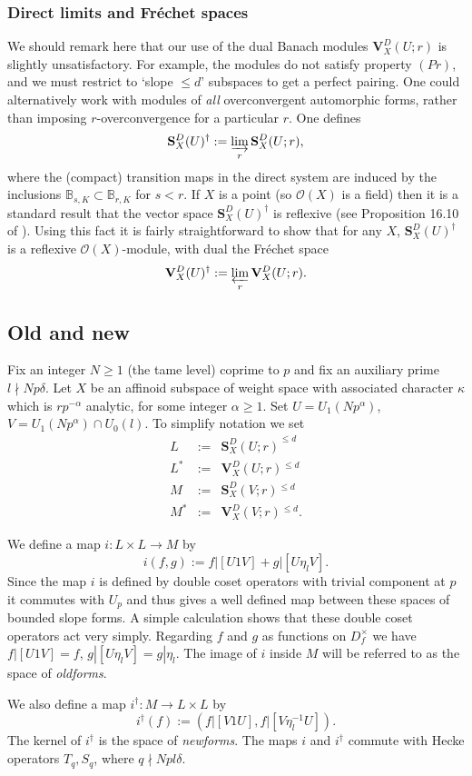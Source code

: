 \documentclass[a4paper, notitlepage]{amsart}
\newcommand{\M}{\ensuremath{\mathfrak{M}}\xspace}
\newcommand{\OO}{\ensuremath{\mathscr{O}}\xspace}
\newcommand{\OC}{\ensuremath{\mathbf{S}^D_{X}(U;r)}\xspace}
\newcommand{\OCdag}{\ensuremath{\mathbf{S}^D_{X}(U)^\dagger}\xspace}
\newcommand{\OCddag}{\ensuremath{\mathbf{V}^D_{X}(U)^\dagger}\xspace}
\newcommand{\OCV}{\ensuremath{\mathbf{S}^D_{X}(V;r)}\xspace}
\newcommand{\OCd}{\ensuremath{\mathbf{V}^D_{X}(U;r)}\xspace}
\newcommand{\OCdV}{\ensuremath{\mathbf{V}^D_{X}(V;r)}\xspace}
\newcommand{\s}{\ensuremath{^{\leq d}}\xspace}
\newcommand{\UU}{\ensuremath{U_1(Np^\alpha)}\xspace}
\newcommand{\VV}{\ensuremath{U_1(Np^\alpha)\cap U_0(l)}\xspace}
\begin{document}
\subsubsection{Direct limits and Fr\'echet spaces}
We should remark here that our use of the dual Banach modules $\OCd$ is slightly unsatisfactory. For example, the modules do not satisfy property $(Pr)$, and we must restrict to `slope $\leq d$' subspaces to get a perfect pairing. One could alternatively work with modules of \emph{all} overconvergent automorphic forms, rather than imposing $r$-overconvergence for a particular $r$. One defines
$$\OCdag :=  \varinjlim_r \OC,$$
where the (compact) transition maps in the direct system are induced by the inclusions $\mathbb{B}_{s,K} \subset \mathbb{B}_{r,K}$ for $s < r$. 
If $X$ is a point (so $\OO(X)$ is a field) then it is a standard result that the vector space $\OCdag$ is reflexive (see Proposition 16.10 of \cite{NFA}). Using this fact it is fairly straightforward to show that for any $X$, $\OCdag$ is a reflexive $\OO(X)$-module, with dual the Fr\'echet space
$$\OCddag := \varprojlim_r \OCd.$$
\subsection{Old and new}\label{oldnew}
Fix an integer $N\ge 1$ (the tame level) coprime to $p$ and fix an auxiliary prime $l \nmid Np\delta$. Let $X$ be an affinoid subspace of weight space with associated character $\kappa$ which is $rp^{-\alpha}$ analytic, for some integer $\alpha \ge 1$. Set $U=\UU$, $V=\VV$. To simplify notation we set \begin{eqnarray*}L&:=&\OC^{\leq d}\\L^*&:=&\OCd\s \\M&:=&\OCV\s\\M^*&:=&\OCdV\s.\end{eqnarray*} 

We define a map $i:L \times L \rightarrow M$ by
$$i(f,g):=f|[U 1 V]+g|[U \eta_l V].$$ Since the map $i$ is defined by double coset operators with trivial component at $p$ it commutes with $U_p$ and thus gives a well defined map between these spaces of bounded slope forms.
A simple calculation shows that these double coset operators act very simply. Regarding $f$ and $g$ as functions on $D^\times_f$ we have $f|[U 1 V]=f$, $g|[U\eta_l V]=g|\eta_l$. The image of $i$ inside $M$ will be referred to as the space of \emph{oldforms}.

We also define a map $i^\dagger:M \rightarrow L \times L$ by
$$i^\dagger (f):=(f|[V 1 U],f|[V \eta_l^{-1} U]).$$ The kernel of $i^\dagger$ is the space of \emph{newforms}. The maps $i$ and $i^\dagger$ commute with Hecke operators $T_q, S_q$, where $q \nmid Npl\delta$.
\end{document}
